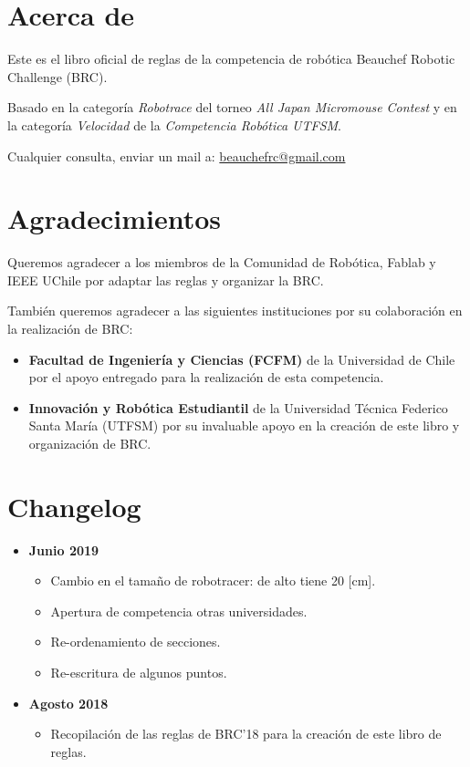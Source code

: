 
\section*{Acerca de}
Este es el libro oficial de reglas de la competencia de robótica Beauchef Robotic Challenge (BRC).

Basado en la categoría \emph{Robotrace} del torneo \emph{All Japan Micromouse Contest} y en la categoría \emph{Velocidad} de la \emph{Competencia Robótica UTFSM}.

Cualquier consulta, enviar un mail a: \href{mailto:beauchefrc@gmail.com}{beauchefrc@gmail.com}

\section*{Agradecimientos}

Queremos agradecer a los miembros de la Comunidad de Robótica, Fablab y IEEE UChile por adaptar las reglas y organizar la BRC.

También queremos agradecer a las siguientes instituciones por su colaboración en la realización de BRC:

\begin{itemize}
   \item \textbf{Facultad de Ingeniería y Ciencias (FCFM)} de la Universidad de Chile por el apoyo entregado para la realización de esta competencia. 
   \item  \textbf{Innovación y Robótica Estudiantil} de la Universidad Técnica Federico Santa María (UTFSM) por su invaluable apoyo en la creación de este libro y organización de BRC.
 \end{itemize} 


\section*{Changelog}

\begin{itemize}
  \item \textbf{Junio 2019}
  \begin{itemize}
    \item Cambio en el tamaño de robotracer: de alto tiene 20 [cm].
    \item Apertura de competencia otras universidades.
    \item Re-ordenamiento de secciones.
    \item Re-escritura de algunos puntos.
  \end{itemize}
  \item \textbf{Agosto 2018}
  \begin{itemize}
    \item Recopilación de las reglas de BRC'18 para la creación de este libro de reglas.
  \end{itemize}
\end{itemize}


